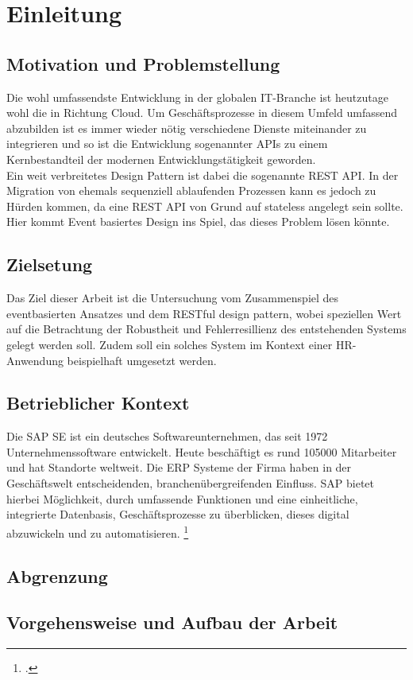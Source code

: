 \section{Einleitung}

\subsection{Motivation und Problemstellung}
Die wohl umfassendste Entwicklung in der globalen \ac{IT}-Branche ist heutzutage wohl die in Richtung Cloud. Um Geschäftsprozesse in diesem Umfeld umfassend abzubilden ist es immer wieder nötig verschiedene Dienste miteinander zu integrieren und so ist die Entwicklung sogenannter APIs zu einem Kernbestandteil der modernen Entwicklungstätigkeit geworden.
\\Ein weit verbreitetes Design Pattern ist dabei die sogenannte \ac{REST} \ac{API}. In der Migration von ehemals sequenziell ablaufenden Prozessen kann es jedoch zu Hürden kommen, da eine \ac{REST} \ac{API} von Grund auf stateless angelegt sein sollte. Hier kommt Event basiertes Design ins Spiel, das dieses Problem lösen könnte.



\subsection{Zielsetung}
Das Ziel dieser Arbeit ist die Untersuchung vom Zusammenspiel des eventbasierten Ansatzes und dem \ac{REST}ful design pattern, wobei speziellen Wert auf die Betrachtung der Robustheit und Fehlerresillienz des entstehenden Systems gelegt werden soll. Zudem soll ein solches System im Kontext einer HR-Anwendung beispielhaft umgesetzt werden.


\subsection{Betrieblicher Kontext}
Die SAP SE ist ein deutsches Softwareunternehmen, das seit 1972 Unternehmenssoftware entwickelt. Heute beschäftigt es rund 105000 Mitarbeiter und hat Standorte weltweit. Die \ac{ERP} Systeme der Firma haben in der Geschäftswelt entscheidenden, branchenübergreifenden Einfluss. SAP bietet hierbei Möglichkeit, durch umfassende Funktionen und eine einheitliche, integrierte Datenbasis, Geschäftsprozesse zu überblicken, dieses digital abzuwickeln und zu automatisieren. \footcite[Vgl.][]{sapse_was}

\subsection{Abgrenzung}
\subsection{Vorgehensweise und Aufbau der Arbeit}
    